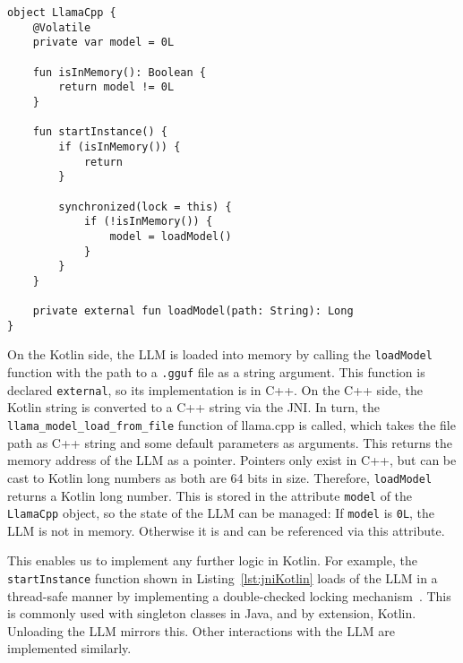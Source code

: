 \vspace{0.25cm}

\begin{lstlisting}[caption={[JNI: Kotlin side]{Example for the Kotlin side of the \gls{JNI}: State management for the \gls{LLM} using a function declared \lstinline|external| at the end.}}, label={lst:jniKotlin}]
object LlamaCpp {
    @Volatile
    private var model = 0L

    fun isInMemory(): Boolean {
        return model != 0L
    }

    fun startInstance() {
        if (isInMemory()) {
            return
        }

        synchronized(lock = this) {
            if (!isInMemory()) {
                model = loadModel()
            }
        }
    }

    private external fun loadModel(path: String): Long
}
\end{lstlisting}

On the Kotlin side, the \gls{LLM} is loaded into memory by calling the \lstinline|loadModel| function with the path to a \lstinline|.gguf| file as a string argument. This function is declared \lstinline|external|, so its implementation is in C++. On the C++ side, the Kotlin string is converted to a C++ string via the \gls{JNI}. In turn, the \lstinline|llama_model_load_from_file| function of llama.cpp is called, which takes the file path as C++ string and some default parameters as arguments. This returns the memory address of the \gls{LLM} as a pointer. Pointers only exist in C++, but can be cast to Kotlin long numbers as both are 64 bits in size. Therefore, \lstinline|loadModel| returns a Kotlin long number. This is stored in the attribute \lstinline|model| of the \lstinline|LlamaCpp| object, so the state of the \gls{LLM} can be managed: If \lstinline|model| is \lstinline|0L|, the \gls{LLM} is not in memory. Otherwise it is and can be referenced via this attribute.

This enables us to implement any further logic in Kotlin. For example, the \lstinline|startInstance| function shown in Listing~\ref{lst:jniKotlin} loads of the \gls{LLM} in a thread-safe manner by implementing a double-checked locking mechanism~\cite{ishizakiTransformingJavaPrograms2014}. This is commonly used with singleton classes in Java, and by extension, Kotlin. Unloading the \gls{LLM} mirrors this. Other interactions with the \gls{LLM} are implemented similarly.

